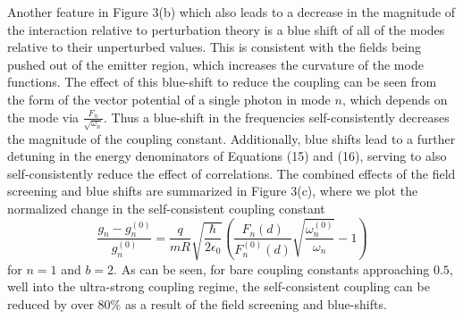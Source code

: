 \documentclass[aps,prb,twocolumn,
	groupedaddress,superscriptaddress,
	amsfonts,amssymb,amsmath,floatfix,
	citeautoscript]{revtex4-1}
\begin{document}
Another feature in Figure 3(b) which also leads to a decrease in the magnitude of the interaction relative to perturbation theory is a blue shift of all of the modes relative to their unperturbed values. This is consistent with the fields being pushed out of the emitter region, which increases the curvature of the mode functions. The effect of this blue-shift to reduce the coupling can be seen from the form of the vector potential of a single photon in mode $n$, which depends on the mode via $\frac{F_n}{\sqrt{\omega_n}}$. Thus a blue-shift in the frequencies self-consistently decreases the magnitude of the coupling constant. Additionally, blue shifts lead to a further detuning in the energy denominators of Equations (15) and (16), serving to also self-consistently reduce the effect of correlations. The combined effects of the field screening and blue shifts are summarized in Figure 3(c), where we plot the normalized change in the self-consistent coupling constant 
\begin{equation}
\frac{g_n-g_n^{(0)}}{g_n^{(0)}} = \frac{q}{mR}\sqrt{\frac{\hbar}{2\epsilon_0}}\left(\frac{F_n(d)}{F^{(0)}_n(d)}\sqrt{\frac{\omega^{(0)}_n}{\omega_n}}-1\right)
\end{equation}
for $n=1$ and $b=2$. As can be seen, for bare coupling constants approaching $0.5$, well into the ultra-strong coupling regime, the self-consistent coupling can be reduced by over 80\% as a result of the field screening and blue-shifts.
\end{document}
